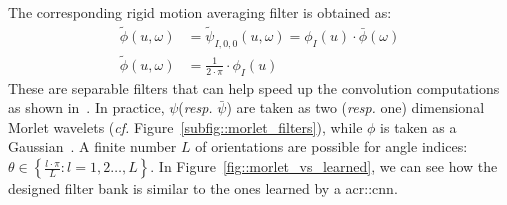                     The corresponding rigid motion averaging filter is obtained as:
                    \begin{align}
                        \label{eq::roto-translation_low_pass}
                        \tilde{\phi}(u, \omega) &= \tilde{\psi}_{I, 0, 0}(u, \omega) = \phi_I(u) \cdot \bar\phi(\omega) \nonumber \\
                        \tilde{\phi}(u, \omega) &= \frac{1}{2\cdot\pi} \cdot \phi_I(u)
                    \end{align}
                    These are separable filters that can help speed up the convolution computations as shown in~\textcite{sifre2013rotation}.
                    In practice, $\psi$(\textit{resp.} $\bar\psi$) are taken as two (\textit{resp.} one) dimensional Morlet wavelets (\textit{cf.} Figure~\ref{subfig::morlet_filters}), while $\phi$ is taken as a Gaussian~\parencite{sifre2013rotation,bruna2013invariant,oyallon2015deep}.
                    A finite number $L$ of orientations are possible for angle indices: $\theta \in \left\{\frac{l\cdot\pi}{L}: l=1,2\dots,L\right\}$.
                    In Figure~\ref{fig::morlet_vs_learned}, we can see how the designed filter bank is similar to the ones learned by a \gls{acr::cnn}.
